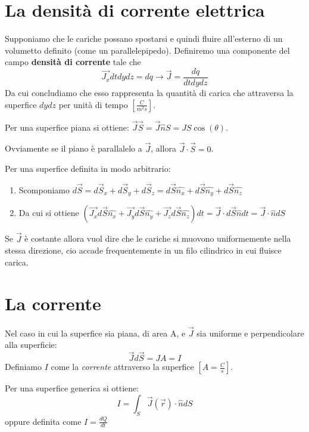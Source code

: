 \documentclass{book}
\begin{document}
\section{La densit\`a di corrente elettrica}
Supponiamo che le cariche possano spostarsi e quindi fluire all'esterno di un volumetto definito (come un parallelepipedo).
Definiremo una componente del campo \textbf{densità di corrente} tale che
\[
  \vec{J_x} dt dy dz = dq \rightarrow \vec{J} = \frac{dq}{dt dy dz}
\]
Da cui concludiamo che esso rappresenta la quantità di carica che attraversa la superfice $dydz$ per unità di tempo $\left[\frac{C}{m^2s}\right]$.

Per una superfice piana si ottiene: $\vec{J} \vec{S} = \vec{J} \hat{n} S = JS \cos(\theta)$.

Ovviamente se il piano è parallalelo a $\vec{J}$, allora $\vec{J} \cdot \vec{S} = 0$.

Per una superfice definita in modo arbitrario:
\begin{enumerate}
  \item Scomponiamo $d\vec{S}=d\vec{S}_x + d\vec{S}_y + d\vec{S}_z =  d\vec{S}\hat{n_x} + d\vec{S} \hat{n_y} + d\vec{S} \hat{n_z}$
  \item Da cui si ottiene $\left(\vec{J_x}d\vec{S}\hat{n_x} + \vec{J_y}d\vec{S}\hat{n_y} + \vec{J_z}d\vec{S}\hat{n_z}\right) dt = \vec{J} \cdot d\vec{S} \hat{n}dt = \vec{J} \cdot \hat{n} dS$   
\end{enumerate}


Se $\vec{J}$ è costante allora vuol dire che le cariche si muovono uniformemente nella stessa direzione, cio accade frequentemente
in un filo cilindrico in cui fluisce carica.



\section{La corrente}
Nel caso in cui la superfice sia piana, di area A, e $\vec{J}$ sia uniforme e perpendicolare alla superficie: 
\[
\vec{J}d\vec{S}=JA=I
\]
Definiamo $I$ come la \emph{corrente} attraverso la superfice $\left[A=\frac{C}{s}\right]$.

Per una superfice generica si ottiene:
\[
I = \int_S \vec{J}(\vec{r}) \cdot \hat{n}d{S} 
\]
oppure definita come $I=\frac{dQ}{dt}$
\end{document}
